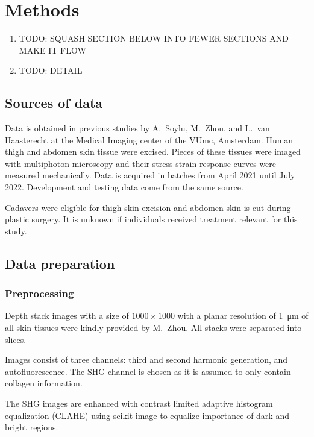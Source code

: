 \section{Methods}
\begin{enumerate}
    \item TODO: SQUASH SECTION BELOW INTO FEWER SECTIONS AND MAKE IT FLOW
    \item TODO: DETAIL
\end{enumerate}

\subsection{Sources of data}

Data is obtained in previous studies by A.\ Soylu, M.\ Zhou, and L.\ van Haasterecht at the Medical Imaging center of the VUmc, Amsterdam.
Human thigh and abdomen skin tissue were excised.
Pieces of these tissues were imaged with multiphoton microscopy and their stress-strain response curves were measured mechanically.
Data is acquired in batches from April 2021 until July 2022.
Development and testing data come from the same source.

Cadavers were eligible for thigh skin excision and abdomen skin is cut during plastic surgery.
It is unknown if individuals received treatment relevant for this study.


\subsection{Data preparation}\label{sec:skin_data_prep}

\subsubsection{Preprocessing}

Depth stack images with a size of $1000\times 1000$ with a planar resolution of \qty{1}{\micro\meter} of all skin tissues were kindly provided by M.\ Zhou.
All stacks were separated into slices.

Images consist of three channels: third and second harmonic generation, and autofluorescence.
The SHG channel is chosen as it is assumed to only contain collagen information.

The SHG images are enhanced with contrast limited adaptive histogram equalization (CLAHE) \cite{Zuiderveld1994ContrastLA} using scikit-image \cite{scikit-image} to equalize importance of dark and bright regions.

